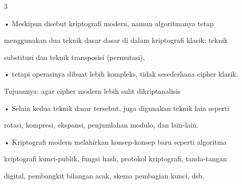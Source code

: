 \documentclass{article}
\begin{document}

3

• Meskipun disebut kriptografi modern, namun algoritmanya tetap 

menggunakan dua teknik dasar dasar  di dalam kriptografi klasik: teknik 

substitusi dan teknik transposisi (permutasi), 

• tetapi operasinya dibuat lebih kompleks, tidak sesederhana cipher klasik.

   Tujuannya: agar cipher modern lebih sulit dikriptanalisis

• Selain kedua teknik dasar tersebut, juga digunakan teknik lain seperti 

rotasi, kompresi, ekspansi, penjumlahan modulo, dan lain-lain.

• Kriptografi modern melahirkan konsep-konsep baru seperti algoritma  

kriptografi kunci-publik, fungsi hash, protokol kriptografi, tanda-tangan 

digital, pembangkit bilangan acak, skema pembagian kunci, dsb.
\end{document}
